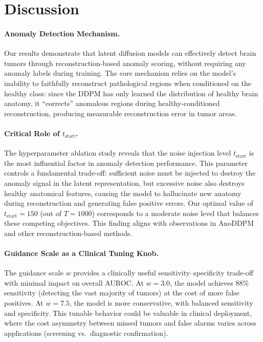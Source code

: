 \section{Discussion}
\label{sec:discussion}

\paragraph{Anomaly Detection Mechanism.} Our results demonstrate that latent diffusion models can effectively detect brain tumors through reconstruction-based anomaly scoring, without requiring any anomaly labels during training. The core mechanism relies on the model's inability to faithfully reconstruct pathological regions when conditioned on the healthy class: since the DDPM has only learned the distribution of healthy brain anatomy, it ``corrects'' anomalous regions during healthy-conditioned reconstruction, producing measurable reconstruction error in tumor areas.

\paragraph{Critical Role of $t_{\text{start}}$.} The hyperparameter ablation study reveals that the noise injection level $t_{\text{start}}$ is the most influential factor in anomaly detection performance. This parameter controls a fundamental trade-off: sufficient noise must be injected to destroy the anomaly signal in the latent representation, but excessive noise also destroys healthy anatomical features, causing the model to hallucinate new anatomy during reconstruction and generating false positive errors. Our optimal value of $t_{\text{start}} = 150$ (out of $T = 1000$) corresponds to a moderate noise level that balances these competing objectives. This finding aligns with observations in AnoDDPM~\cite{wyatt2022anoddpm} and other reconstruction-based methods.

\paragraph{Guidance Scale as a Clinical Tuning Knob.} The guidance scale $w$ provides a clinically useful sensitivity--specificity trade-off with minimal impact on overall AUROC. At $w = 3.0$, the model achieves 88\% sensitivity (detecting the vast majority of tumors) at the cost of more false positives. At $w = 7.5$, the model is more conservative, with balanced sensitivity and specificity. This tunable behavior could be valuable in clinical deployment, where the cost asymmetry between missed tumors and false alarms varies across applications (screening vs.\ diagnostic confirmation).

